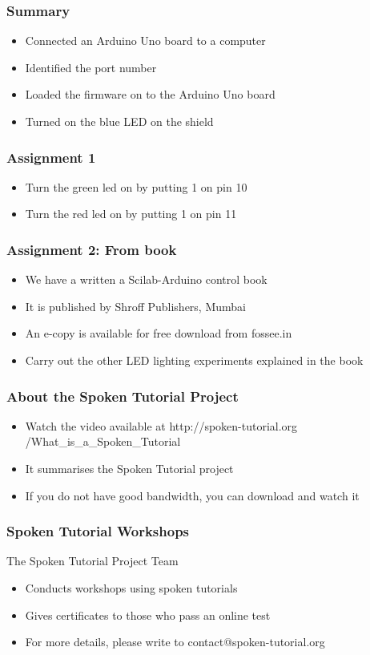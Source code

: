 \documentclass[17pt,xcolor=table]{beamer}
\begin{document}
\begin{frame}
  \frametitle{Summary}
  \begin{itemize}
  \item Connected an Arduino Uno board to a computer
  \item Identified the port number
  \item Loaded the firmware on to the Arduino Uno board
  \item Turned on the blue LED on the shield
  \end{itemize}
\end{frame}

\begin{frame}
  \frametitle{Assignment 1}
  \begin{itemize}
  \item Turn the green led on by putting 1 on pin 10
  \item Turn the red led on by putting 1 on pin 11
  \end{itemize}
\end{frame}

\begin{frame}
  \frametitle{Assignment 2: From book}
  \begin{itemize}
  \item We have a written a Scilab-Arduino control book
  \item It is published by Shroff Publishers, Mumbai
  \item An e-copy is available for free download from fossee.in
  \item Carry out the other LED lighting experiments explained in the
    book
  \end{itemize}
\end{frame}

\begin{frame}
\frametitle{About the Spoken Tutorial Project}
\begin{itemize}
\item Watch the video available at {\color{blue} http://spoken-tutorial.org /What\_is\_a\_Spoken\_Tutorial}
\item It summarises the Spoken Tutorial project \pause
\item If you do not have good bandwidth, you can download and watch it
\end{itemize}
\end{frame}

\begin{frame}
\frametitle{Spoken Tutorial Workshops}
The Spoken Tutorial Project Team
\begin{itemize}
\item Conducts workshops using spoken tutorials
\item Gives certificates to those who pass an online test
\item For more details, please write to {\color{blue} contact@spoken-tutorial.org}
\end{itemize}
\end{frame}
\end{document}
